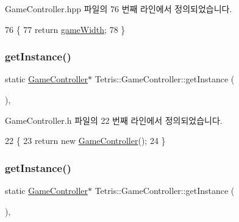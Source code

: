 Game\+Controller.\+hpp 파일의 76 번째 라인에서 정의되었습니다.


\begin{DoxyCode}
76                                         \{
77                 \textcolor{keywordflow}{return} \hyperlink{class_tetris_1_1_game_controller_a439f215918db4127fcb44cf9d501ed63}{gameWidth};
78             \}
\end{DoxyCode}
\mbox{\label{class_tetris_1_1_game_controller_af996b3264a1ed606a89be9e72310e569}} 
\subsubsection{\texorpdfstring{get\+Instance()}{getInstance()}\hspace{0.1cm}{\footnotesize\ttfamily [1/2]}}
{\footnotesize\ttfamily static \hyperlink{class_tetris_1_1_game_controller}{Game\+Controller}$\ast$ Tetris\+::\+Game\+Controller\+::get\+Instance (\begin{DoxyParamCaption}{ }\end{DoxyParamCaption})\hspace{0.3cm}{\ttfamily [inline]}, {\ttfamily [static]}}



Game\+Controller.\+h 파일의 22 번째 라인에서 정의되었습니다.


\begin{DoxyCode}
22                                                 \{
23                 \textcolor{keywordflow}{return} \textcolor{keyword}{new} \hyperlink{class_tetris_1_1_game_controller_a968c9a79fca8a5a39e0c51edca0e5abb}{GameController}();
24             \}
\end{DoxyCode}
\mbox{\label{class_tetris_1_1_game_controller_af996b3264a1ed606a89be9e72310e569}} 
\subsubsection{\texorpdfstring{get\+Instance()}{getInstance()}\hspace{0.1cm}{\footnotesize\ttfamily [2/2]}}
{\footnotesize\ttfamily static \hyperlink{class_tetris_1_1_game_controller}{Game\+Controller}$\ast$ Tetris\+::\+Game\+Controller\+::get\+Instance (\begin{DoxyParamCaption}{ }\end{DoxyParamCaption})\hspace{0.3cm}{\ttfamily [inline]}, {\ttfamily [static]}}


